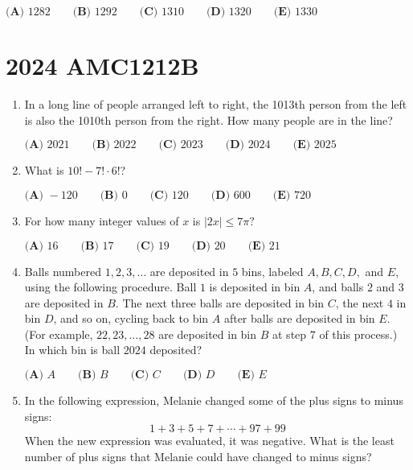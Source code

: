 \documentclass{article}
\begin{document}
\begin{enumerate}[label=\arabic*., itemsep=0.5em]
$\textbf{(A) }1282\qquad\textbf{(B) }1292\qquad\textbf{(C) }1310\qquad\textbf{(D) }1320\qquad\textbf{(E) }1330$\par \vspace{0.5em}\end{enumerate}\newpage\section*{2024 AMC1212B}\begin{enumerate}[label=\arabic*., itemsep=0.5em]\item In a long line of people arranged left to right, the 1013th person from the left is also the 1010th person from the right. How many people are in the line?

$\textbf{(A) } 2021 \qquad\textbf{(B) } 2022 \qquad\textbf{(C) } 2023 \qquad\textbf{(D) } 2024 \qquad\textbf{(E) } 2025$\par \vspace{0.5em}\item What is $10! - 7! \cdot 6!$?

$\textbf{(A) }-120 \qquad\textbf{(B) }0 \qquad\textbf{(C) }120 \qquad\textbf{(D) }600 \qquad\textbf{(E) }720 \qquad$\par \vspace{0.5em}\item For how many integer values of $x$ is $|2x|\leq 7\pi?$

$\textbf{(A) }16 \qquad\textbf{(B) }17\qquad\textbf{(C) }19\qquad\textbf{(D) }20\qquad\textbf{(E) }21$\par \vspace{0.5em}\item Balls numbered $1,2,3,\ldots$ are deposited in $5$ bins, labeled $A,B,C,D,$ and $E$, using the following procedure. Ball $1$ is deposited in bin $A$, and balls $2$ and $3$ are deposited in $B$. The next three balls are deposited in bin $C$, the next $4$ in bin $D$, and so on, cycling back to bin $A$ after balls are deposited in bin $E$. (For example, $22,23,\ldots,28$ are deposited in bin $B$ at step 7 of this process.) In which bin is ball $2024$ deposited?

$\textbf{(A) }A\qquad\textbf{(B) }B\qquad\textbf{(C) }C\qquad\textbf{(D) }D\qquad\textbf{(E) }E$\par \vspace{0.5em}\item In the following expression, Melanie changed some of the plus signs to minus signs:
\begin{equation*}
1 + 3+5+7+\cdots+97+99
\end{equation*}
When the new expression was evaluated, it was negative. What is the least number of plus signs that Melanie could have changed to minus signs?


\end{enumerate}
\end{document}
